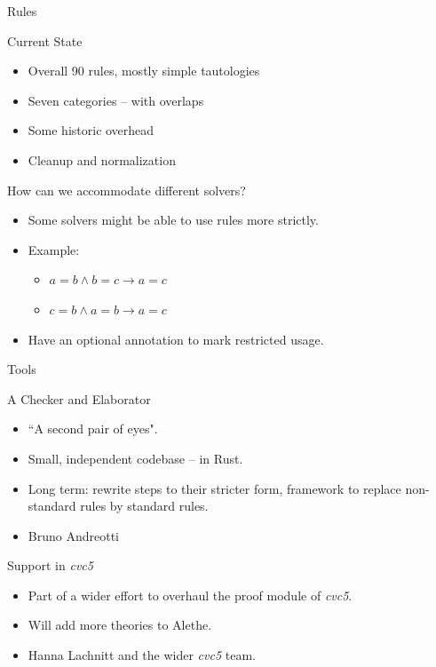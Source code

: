 \documentclass[aspectratio=169,compress]{beamer}
\newcommand\limp{\rightarrow}
\begin{document}

\begin{frame}{Rules}
    \begin{block}{Current State}
    \begin{itemize}
        \item Overall 90 rules, mostly simple tautologies
        \item Seven categories -- with overlaps
        \item Some historic overhead
        \item[\emoji{building-construction}] Cleanup and normalization
    \end{itemize}
    \end{block}
    \pause
    \begin{block}{How can we accommodate different solvers?}
        \begin{itemize}
            \item Some solvers might be able to use rules more strictly.
            \item Example:
            \begin{itemize}
                \item $a = b \land b = c\limp a = c$
                \item $c = b \land a = b\limp a = c$
            \end{itemize}
            \item[\emoji{light-bulb}] Have an optional annotation to mark restricted usage.
        \end{itemize}
    \end{block}
\end{frame}

\begin{frame}{Tools}
    \begin{block}{A Checker and Elaborator}
    \begin{itemize}
        \item ``A second pair of eyes".
        \item Small, independent codebase -- in Rust.
        \item Long term: rewrite steps to their stricter form, framework
              to replace non-standard rules by standard rules.
        \item[\emoji{man}] Bruno Andreotti
    \end{itemize}
    \end{block}
    \pause
    \begin{block}{Support in \emph{cvc5}}
        \begin{itemize}
            \item Part of a wider effort to overhaul the proof module of \emph{cvc5}.
            \item Will add more theories to Alethe.
            \item[\emoji{woman}] Hanna Lachnitt and the wider \emph{cvc5} team.
        \end{itemize}
    \end{block}
\end{frame}
\end{document}
